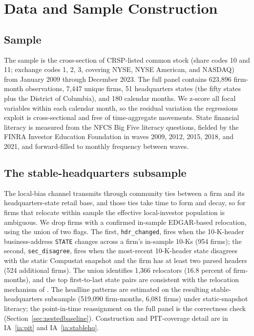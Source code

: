 \section{Data and Sample Construction}
\label{sec:data}

\subsection{Sample}

The sample is the cross-section of CRSP-listed common stock (share codes 10 and 11; exchange codes 1, 2, 3, covering NYSE, NYSE American, and NASDAQ) from January 2009 through December 2023. The full panel contains 623,896 firm-month observations, 7,447 unique firms, 51 headquarters states (the fifty states plus the District of Columbia), and 180 calendar months. We z-score all focal variables within each calendar month, so the residual variation the regressions exploit is cross-sectional and free of time-aggregate movements. State financial literacy is measured from the NFCS Big Five literacy questions, fielded by the FINRA Investor Education Foundation in waves 2009, 2012, 2015, 2018, and 2021, and forward-filled to monthly frequency between waves.

\subsection{The stable-headquarters subsample}
\label{sec:stablehq}

The local-bias channel transmits through community ties between a firm and its headquarters-state retail base, and those ties take time to form and decay, so for firms that relocate within sample the effective local-investor population is ambiguous. We drop firms with a confirmed in-sample EDGAR-based relocation, using the union of two flags. The first, \texttt{hdr\_changed}, fires when the 10-K-header business-address \texttt{STATE} changes across a firm's in-sample 10-Ks (954 firms); the second, \texttt{sec\_disagree}, fires when the most-recent 10-K-header state disagrees with the static Compustat snapshot and the firm has at least two parsed headers (524 additional firms). The union identifies 1,366 relocators (16.8 percent of firm-months), and the top first-to-last state pairs are consistent with the relocation mechanism of \citet{pirinskyWang2006}. The headline patterns are estimated on the resulting stable-headquarters subsample (519,090 firm-months, 6,081 firms) under static-snapshot literacy; the point-in-time reassignment on the full panel is the correctness check (Section~\ref{sec:nestedbaseline}). Construction and PIT-coverage detail are in IA~\ref{ia:pit} and IA~\ref{ia:stablehq}.

